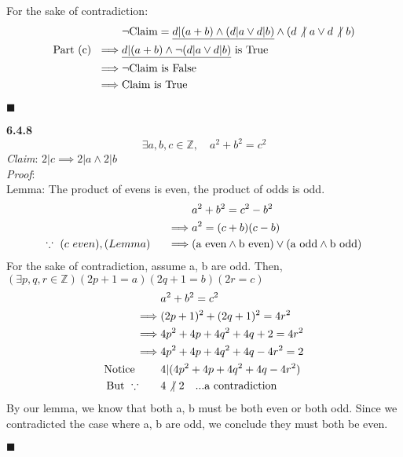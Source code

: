 \documentclass[12pt]{article}
\begin{document}
For the sake of contradiction: 
\begin{align*}
&\neg \textnormal{Claim} = \underline{d|(a+b) \land (d|a \lor d|b)} \land (d \not|\ a \lor d \not|\ b)\\
\textnormal{Part (c)}\ \implies& \underline{d|(a+b)\land \neg(d|a \lor d|b)} \textnormal{ is True}\\
\implies& \neg \textnormal{Claim is False}\\
\implies& \textnormal{Claim is True}
\end{align*}
\begin{flushright}
$\blacksquare$
\end{flushright}
\pagebreak
\textbf{6.4.8}
$$\exists a, b, c \in \mathbb{Z}, \quad a^2+b^2=c^2$$
\emph{Claim}: $2|c \implies 2|a \land 2|b$\\

\emph{Proof}:\\

Lemma: The product of evens is even, the product of odds is odd.
\begin{align*}
&a^2+b^2=c^2-b^2\\ 
\implies& a^2=(c+b)(c-b)\\
\because\ (c\ even), (Lemma)\ \quad\implies& (\textnormal{a even} \land \textnormal{b even}) \lor (\textnormal{a odd} \land \textnormal{b odd})
\end{align*}
For the sake of contradiction, assume a, b are odd. Then, $(\exists p, q, r \in \mathbb{Z})(2p+1=a)(2q+1=b)(2r=c)$
\begin{align*}
&a^2+b^2=c^2\\
\implies& (2p+1)^2+(2q+1)^2=4r^2\\
\implies& 4p^2+4p+4q^2+4q+2=4r^2\\
\implies& 4p^2+4p+4q^2+4q-4r^2=2\\
\textnormal{Notice}\ \quad\quad& 4|(4p^2+4p+4q^2+4q-4r^2)\\
\textnormal{But}\ \because\quad\quad& 4 \not |\ 2\quad\textnormal{...a contradiction}
\end{align*}
By our lemma, we know that both a, b must be both even or both odd. Since we contradicted the case where a, b are odd, we conclude they must both be even.
\begin{flushright}
$\blacksquare$
\end{flushright}
\end{document}
